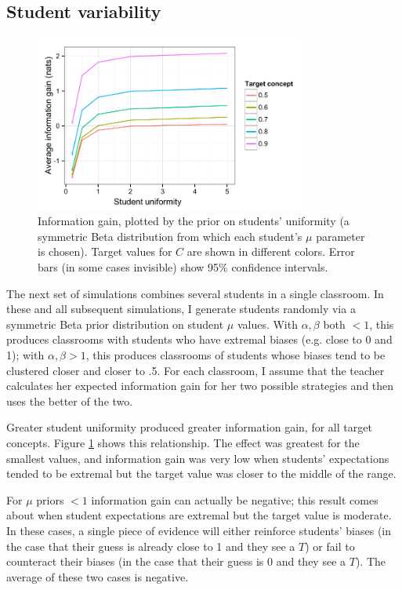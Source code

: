 \documentclass[10pt,letterpaper]{article}
\begin{document}
\subsection{Student variability}

\begin{figure}[t]
\begin{center}
\includegraphics[width=3.5in]{figures/student_uniformity.pdf}
\end{center}
\caption{\label{fig:uniformity} Information gain, plotted by the prior on students' uniformity (a symmetric Beta distribution from which each student's $\mu$ parameter is chosen). Target values for $C$ are shown in different colors. Error bars (in some cases invisible) show 95\% confidence intervals.}
\end{figure}

The next set of simulations combines several students in a single classroom. In these and all subsequent simulations, I generate students randomly via a symmetric Beta prior distribution on student $\mu$ values. With $\alpha,\beta$ both $< 1$, this produces classrooms with students who have extremal biases (e.g. close to 0 and 1); with $\alpha,\beta>1$, this produces classrooms of students whose biases tend to be clustered closer and closer to .5. For each classroom, I assume that the teacher calculates her expected information gain for her two possible strategies and then uses the better of the two. 

Greater student uniformity produced greater information gain, for all target concepts. Figure \ref{fig:uniformity} shows this relationship. The effect was greatest for the smallest values, and information gain was very low when students' expectations tended to be extremal but the target value was closer to the middle of the range. 

For $\mu$ priors $< 1$ information gain can actually be negative; this result comes about when student expectations are extremal but the target value is moderate. In these cases, a single piece of evidence will either reinforce students' biases (in the case that their guess is already close to 1 and they see a $T$) or fail to counteract their biases (in the case that their guess is 0 and they see a $T$). The average of these two cases is negative.
\end{document}
